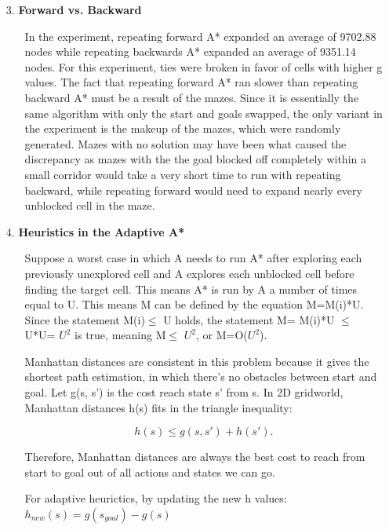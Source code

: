 \documentclass{article}
\begin{document}
\begin{enumerate}
        \item[3.] \textbf{Forward vs. Backward}
            \begin{enumerate}
                \item[] In the experiment, repeating forward A* expanded an average of 9702.88 nodes while repeating backwards A* expanded an average of 9351.14 nodes.  For this experiment, ties were broken in favor of cells with higher g values.  The fact that repeating forward A* ran slower than repeating backward A* must be a result of the mazes.  Since it is essentially the same algorithm with only the start and goals swapped, the only variant in the experiment is the makeup of the mazes, which were randomly generated.  Mazes with no solution may have been what caused the discrepancy as mazes with the the goal blocked off completely within a small corridor would take a very short time to run with repeating backward, while repeating forward would need to expand nearly every unblocked cell in the maze.
            \end{enumerate}
        \item[4.] \textbf{Heuristics in the Adaptive A* }
            \begin{enumerate}
                \item[] Suppose a worst case in which A needs to run A* after exploring each previously unexplored cell and A explores each unblocked cell before finding the target cell. This means A* is run by A a number of times equal to U. This means M can be defined by the equation M=M(i)*U. Since the statement  M(i)$\le$ U holds, the statement M= M(i)*U $\le$ U*U= $U^2$ is true, meaning M$\le$ $U^2$, or M=O($U^2$). 
            
            \item[ ] Manhattan distances are consistent in this problem because it gives the shortest path estimation, in which there's no obstacles between start and goal.
            Let g(s, s') is the cost reach state s' from s. In 2D gridworld, Manhattan distances h(s) fits in the triangle inequality: 
            
            \[h(s) \leq g(s, s') + h(s'). \]
            
            Therefore, Manhattan distances are always the best cost to reach from start to goal out of all actions and states we can go.

            For adaptive heurictics, by updating the new h values: 
            $h_{new}(s) = g(s_{goal}) - g(s)$ \par


\end{enumerate}
\end{enumerate}
\end{document}
